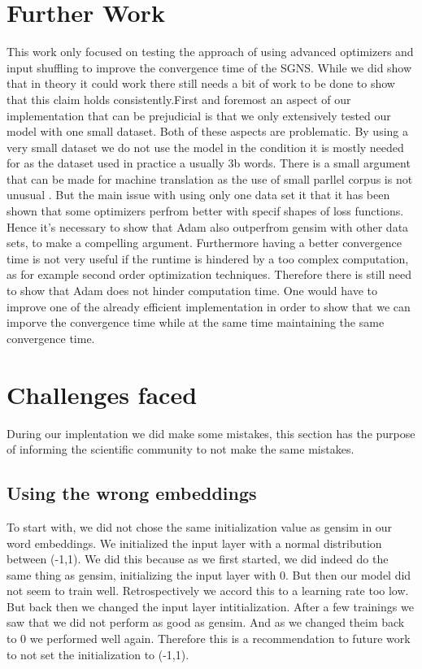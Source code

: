 \section{Further Work}
This work only focused on testing the approach of using advanced optimizers and input shuffling to improve the convergence time of the SGNS. While we did show that in theory it could work there still needs a bit of work to be done to show that this claim holds consistently.First and foremost an aspect of our implementation that can be prejudicial is that we only extensively tested our model with one small dataset. Both of these aspects are problematic. By using a very small dataset we do not use the model in the condition it is mostly needed for as the dataset used in practice a usually 3b words. There is a small argument that can be made for machine translation as the use of small parllel corpus is not unusual . But the main issue with using only one data set it that it has been shown that some optimizers perfrom better with specif shapes of loss functions. Hence it's necessary to show that Adam also outperfrom gensim with other data sets, to make a compelling argument. 
Furthermore having a better convergence time is not very useful if the runtime is hindered by a too complex computation, as for example second order optimization techniques. Therefore there is still need to show that Adam does not hinder computation time.  One would have to improve one of the already efficient implementation in order to show that we can imporve the convergence time while at the same time maintaining the same convergence time.



\section{Challenges faced}
During our implentation we did make some mistakes, this section has the purpose of informing the scientific community to not make the same mistakes. 
\subsection{Using the wrong embeddings}
To start with, we did not chose the same initialization value as gensim in our word embeddings. We initialized the input layer with a normal distribution between (-1,1). We did this because as we first started, we did indeed do the same thing as gensim, initializing the input layer with 0. But then our model did not seem to train well. Retrospectively we accord this to a learning rate too low. But back  then we changed the input layer intitialization. After a few trainings we saw that we did not perform as good as gensim. And as we changed theim back to 0 we performed well again. Therefore this is a recommendation to future work to not set the initialization to (-1,1).


